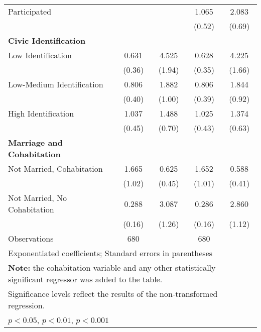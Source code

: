 \begin{table}[htbp]
\begin{tabular}{l*{4}{c}}
\hspace{0.25cm} Participated  &                   &                   &     1.065         &     2.083\sym{*}  \\
                              &                   &                   &    (0.52)         &    (0.69)         \\
\textbf{Civic Identification} &                   &                   &                   &                   \\
\hspace{0.25cm} Low Identification&     0.631         &     4.525\sym{***}&     0.628         &     4.225\sym{***}\\
                              &    (0.36)         &    (1.94)         &    (0.35)         &    (1.66)         \\
\hspace{0.25cm} Low-Medium Identification&     0.806         &     1.882         &     0.806         &     1.844         \\
                              &    (0.40)         &    (1.00)         &    (0.39)         &    (0.92)         \\
\hspace{0.25cm} High Identification&     1.037         &     1.488         &     1.025         &     1.374         \\
                              &    (0.45)         &    (0.70)         &    (0.43)         &    (0.63)         \\
\textbf{Marriage and Cohabitation}&                   &                   &                   &                   \\
\hspace{0.25cm} Not Married, Cohabitation&     1.665         &     0.625         &     1.652         &     0.588         \\
                              &    (1.02)         &    (0.45)         &    (1.01)         &    (0.41)         \\
\hspace{0.25cm} Not Married, No Cohabitation&     0.288\sym{*}  &     3.087\sym{**} &     0.286\sym{*}  &     2.860\sym{*}  \\
                              &    (0.16)         &    (1.26)         &    (0.16)         &    (1.12)         \\
\midrule
Observations                  &       680         &                   &       680         &                   \\
\bottomrule
\multicolumn{5}{l}{\footnotesize Exponentiated coefficients; Standard errors in parentheses}\\
\multicolumn{5}{l}{\footnotesize \textbf{Note:} the cohabitation variable and any other statistically significant regressor was added to the table.}\\
\multicolumn{5}{l}{\footnotesize Significance levels reflect the results of the non-transformed regression.}\\
\multicolumn{5}{l}{\footnotesize \sym{*} \(p<0.05\), \sym{**} \(p<0.01\), \sym{***} \(p<0.001\)}\\
\end{tabular}
\end{table}
